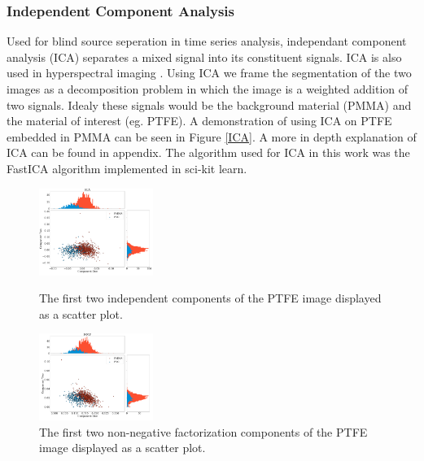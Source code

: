 \documentclass[a4paper,11pt]{article}
\begin{document}
  
  
  

\subsubsection{Independent Component Analysis}

Used for blind source seperation in time series analysis, independant component analysis (ICA) separates a mixed signal into its constituent signals. ICA is also used in hyperspectral imaging \cite{Villa2009OnAnalysis}. Using ICA we frame the segmentation of the two images as a decomposition problem in which the image is a weighted addition of two signals. Idealy these signals would be the background material (PMMA) and the material of interest (eg. PTFE). A demonstration of using ICA on PTFE embedded in PMMA can be seen in Figure \ref{ICA}. A more in depth explanation of ICA can be found in appendix. The algorithm used for ICA in this work was the FastICA \cite{Hyvarinen2000IndependentApplications} algorithm implemented in sci-kit learn.

\begin{figure}
  \begin{center}
    \includegraphics[width=0.33\textwidth]{figures/ICAnone.png}
  \end{center}
  
  \caption{The first two independent components of the PTFE image displayed as a scatter plot.}
  
  \label{ICA}  
  \begin{center}
    \includegraphics[width=0.33\textwidth]{figures/NMFnone.png}
  \end{center}
  
  \caption{The first two non-negative factorization components of the PTFE image displayed as a scatter plot.}
  
  \label{NMF}
\end{figure}
\end{document}
